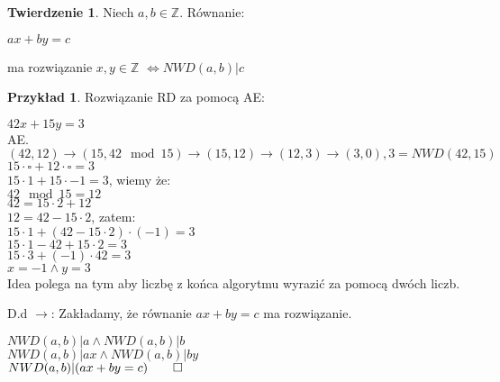 \documentclass{article}
\theoremstyle{definition}
\theoremstyle{definition}
\newtheorem{tw}{Twierdzenie}[subsection]
\theoremstyle{definition}
\newtheorem{pk}{Przykład}[subsection]
\theoremstyle{definition}
\begin{document}
\begin{tw}
    Niech $a,b \in \mathbb{Z}$. Równanie:
    \begin{center}
        $ax+by=c$
    \end{center}
    ma rozwiązanie $x,y\in \mathbb{Z}$
    $\iff NWD(a,b)|c$
\end{tw}

\begin{pk}
    Rozwiązanie RD za pomocą AE:
\begin{center}
    $42x + 15y = 3$\\
    AE. $(42,12)\rightarrow(15,42\mod 15)\rightarrow(15,12)\rightarrow(12,3)\rightarrow(3,0), 3 = NWD(42,15)$\\
    $15\cdot \square + 12\cdot \square = 3$\\
    $15\cdot 1 + 15\cdot -1 = 3$, wiemy że:\\
    $42\mod 15 = 12$\\
    $42 = 15\cdot 2 + 12$\\
    $12=42-15\cdot 2$, zatem:\\
    $15\cdot 1 + (42-15\cdot 2)\cdot(-1)=3$\\
    $15\cdot 1 - 42 + 15\cdot 2 = 3$\\
    $15\cdot 3 + (-1) \cdot 42 = 3$\\
    $x=-1 \land y = 3$\\
    Idea polega na tym aby liczbę z końca algorytmu wyrazić za pomocą dwóch liczb.
\end{center}
\end{pk}

D.d $\rightarrow$:
Zakładamy, że równanie $ax+by=c$ ma rozwiązanie.
\begin{center}
    $NWD(a,b)|a \land NWD(a,b)|b$\\
    $NWD(a,b)|ax \land NWD(a,b)|by$\\
    $NWD(a,b)|(ax+by=c)\qed$
\end{center}
\end{document}
